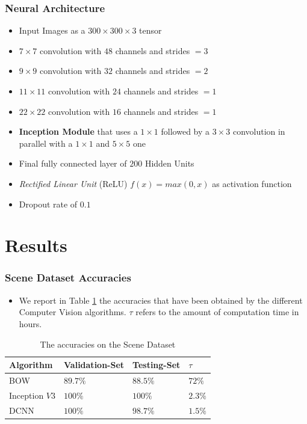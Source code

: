 \documentclass[a0, portrait]{IWIposter}
\begin{document}
\begin{multicols}{3}
\subsubsection*{Neural Architecture}
	\begin{itemize}
		\item Input Images as a $300 \times 300 \times 3$ tensor
		\item $7 \times 7$ convolution with $48$ channels and strides $= 3$
		\item $9 \times 9$ convolution with $32$ channels and strides $= 2$ 
		\item $11 \times 11$ convolution with $24$ channels and strides $= 1$ 
		\item $22 \times 22$ convolution with $16$ channels and strides $= 1$ 
		\item \textbf{Inception Module} that uses a $1 \times 1$ followed by a $3 \times 3$ convolution in parallel with a $1 \times 1$ and $5 \times 5$ one
		\item Final fully connected layer of $200$ Hidden Units
		\item \textit{Rectified Linear Unit} (ReLU) $f(x) = max(0,x)$ as activation function
		\item Dropout rate of $0.1$

	\end{itemize}


\section*{Results}

\centering
\subsubsection*{Scene Dataset Accuracies}

\begin{itemize}
	\item We report in Table \ref{tab:tab1} the accuracies that have been obtained by the different Computer Vision algorithms. $\tau$ refers to the amount of computation time in hours.
\end{itemize}

\begin{table}
\centering
\caption{The accuracies on the Scene Dataset}
\label{tab:tab1}
\begin{tabular}{>{\rowmac}l|>{\rowmac}l|>{\rowmac}l|>{\rowmac}l<{\clearrow}}
\textbf{Algorithm}   & \textbf{Validation-Set} & \textbf{Testing-Set} & \textbf{$\tau$}  \\ \hline
        BOW                    & $89.7\%$             & $88.5\%$           & $72\%$    \\
        Inception $V3$         & $100\%$              & $100\%$            & $2.3\%$     \\
        DCNN                   & $100\%$              & $98.7\%$           & $1.5\%$          \\
\end{tabular}\label{tab:tab1}
\end{table}


\end{multicols}
\end{document}
